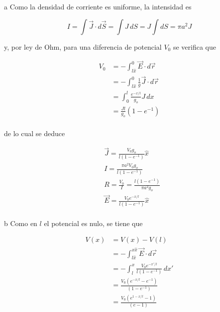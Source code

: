 \begin{solucion}{3}
\ics a
Como la densidad de corriente es uniforme, la intensidad es

\[I =\int\Vec{J}\cdot d\Vec{S} = \int J\,dS =J\int dS = \pi a^2J\]

y, por ley de Ohm, para una diferencia de potencial $V_0$ se verifica que

\begin{equation}
\begin{split}
    V_0 &= -\int^0_{l\hat{x}}\Vec{E}\cdot d\Vec{r}\\
    &= -\int^0_{l\hat{x}}\frac{1}{g}\Vec{J}\cdot d\Vec{r}\\
    &= \int^l_0\frac{e^{-x/l}}{g_o}J\,dx\\
    &= \frac{Jl}{g_o}(1-e^{-1})\\
\end{split}
\nonumber
\end{equation}

de lo cual se deduce

\begin{equation}
\begin{split}
    &\Vec{J}=\frac{V_0g_o}{l(1-e^{-1})}\hat{x}\\
    &I=\frac{\pi a^2V_0g_o}{l(1-e^{-1})}\\
    &R=\frac{V_0}{I}=\frac{l(1-e^{-1})}{\pi a^2 g_o}\\
    &\Vec{E}=\frac{V_0e^{-x/l}}{l(1-e^{-1})}\hat{x}\\
\end{split}
\nonumber
\end{equation}

\ics b
Como en $l$ el potencial es nulo, se tiene que

\begin{equation}
\begin{split}
    V(x) &= V(x) - V(l)\\
    &= -\int^{x\hat{x}}_{l\hat{x}}\Vec{E}\cdot d\Vec{r}\\
    &= -\int^x_l\frac{V_0e^{-x'/l}}{l(1-e^{-1})}\,dx'\\
    &= \frac{V_0(e^{-x/l}-e^{-1})}{(1-e^{-1})}\\
    &= \frac{V_0(e^{1-x/l}-1)}{(e-1)}\\
\end{split}
\nonumber
\end{equation}



\end{solucion}
